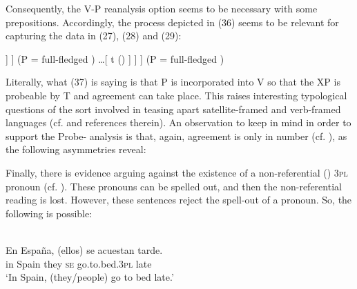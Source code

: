 \documentclass[output=paper]{langsci/langscibook}
\begin{document}
Consequently, the V-P reanalysis option seems to be necessary with some prepositions. Accordingly, the process depicted in (36) seems to be relevant for capturing the data in (27), (28) and (29):


\ea%
    \label{ex:gallego:37}
    \ea\onehalfspacing\relax [ SE \ConnectTail{\textbf{T}} ($\varphi $-Probe)  [\textsubscript{VP} V \ldots\xspace [  P \ConnectHead{\textbf{XP}} (\isi{Goal}) ] ] ] (P = full-fledged ) 
    \ex\onehalfspacing\relax [ SE \ConnectTail{\textbf{T}} ($\varphi $-Probe)  [\textsubscript{VP} [V-P] \ldots\xspace [ t   () ] ] ] (P = full-fledged )
    \z
\z


Literally, what (37) is saying is that P is incorporated into V so that the XP  is probeable by T and agreement can take place. This raises interesting typological questions of the sort involved in teasing apart satellite-framed and verb-framed languages (cf. \citealt{Mateu2012} and references therein). An observation to keep in mind in order to support the Probe- analysis is that, again, agreement is only in number (cf. \citealt{Etxepare2006}), as the following asymmetries reveal:



    \z
    
Finally, there is evidence arguing against the existence of a non-referential () \textsc{3pl} pronoun (cf. \citealt{Suñer1983,Cabredo2003}). These pronouns can be spelled out, and then the non-referential reading is lost. However, these sentences reject the spell-out of a pronoun. So, the following is possible:

\ea%
    \label{ex:gallego:39}\\
    \gll En España, (ellos)  se  acuestan            tarde.    \\
         in  Spain       they   \textsc{se} go.to.bed.\textsc{3pl}   late\\
    \glt ‘In Spain, (they/people) go to bed late.’
    \z
\end{document}
